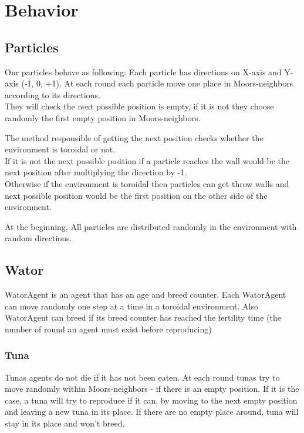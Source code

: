 \section{Behavior}
\label{sec:Behavior}
\subsection{Particles}
Our particles behave as following: Each particle has directions on X-axis and Y-axis (-1, 0, +1). At each round each particle move one place in Moors-neighbors\cite{moore} according to its directions.\\
They will check the next possible position is empty, if it is not they choose randomly the first empty position in Moors-neighbors.

The method responsible of getting the next position checks whether the environment is toroidal or not.\\
If it is not the next possible position if a particle reaches the wall would be the next position after multiplying the direction by -1.\\ Otherwise if the environment is toroidal then particles can get throw walls and next possible position would be the first position on the other side of the environment.

At the beginning, All particles are distributed randomly in the environment with random directions.

\subsection{Wator}
WatorAgent is an agent that has an age and breed counter.  Each WatorAgent can move randomly one step at a time in a toroidal environment. Also WatorAgent can breed if its breed counter has reached the fertility time (the number of round an agent must exist before reproducing)
\subsubsection{Tuna}
Tunas agents do not die if it has not been eaten. At each round tunas try to move randomly within Moors-neighbors - if there is an empty position. If it is the case, a tuna will try to reproduce if it can, by moving to the next empty position and leaving a new tuna in its place. If there are no empty place around, tuna will stay in its place and won't breed.
